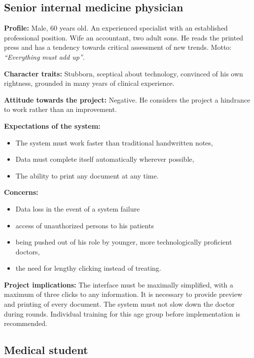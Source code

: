 \subsection{Senior internal medicine physician}

\textbf{Profile:} Male, 60 years old. An experienced specialist with an established professional position. Wife an accountant, two adult sons. He reads the printed press and has a tendency towards critical assessment of new trends. Motto: \emph{``Everything must add up''}.

\textbf{Character traits:} Stubborn, sceptical about technology, convinced of his own rightness, grounded in many years of clinical experience.

\textbf{Attitude towards the project:} Negative. He considers the project a hindrance to work rather than an improvement.

\textbf{Expectations of the system:}
\begin{itemize}
    \item The system must work faster than traditional handwritten notes,
    \item Data must complete itself automatically wherever possible,
    \item The ability to print any document at any time.
\end{itemize}

\textbf{Concerns:}
\begin{itemize}
    \item Data loss in the event of a system failure
    \item access of unauthorized persons to his patients
    \item being pushed out of his role by younger, more technologically proficient doctors,
    \item the need for lengthy clicking instead of treating.
\end{itemize}

\textbf{Project implications:} The interface must be maximally simplified, with a maximum of three clicks to any information. It is necessary to provide preview and printing of every document. The system must not slow down the doctor during rounds. Individual training for this age group before implementation is recommended.

\subsection{Medical student}

